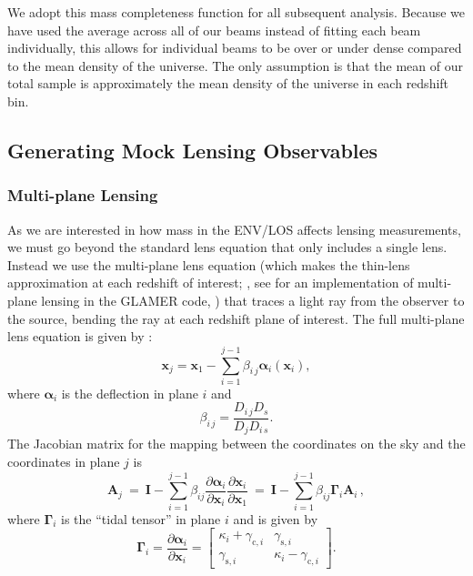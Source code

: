 \documentclass{emulateapj}
\newcommand\A[0]{\mathbf{A}}
\newcommand\I[0]{\mathbf{I}}
\newcommand\GammaMat[0]{\boldsymbol{\Gamma}}
\newcommand\x[0]{\mathbf{x}}
\newcommand\al[0]{\boldsymbol{\alpha}}
\begin{document}
We adopt this mass completeness function for all subsequent analysis. Because we have used the average across all of our beams instead of fitting each beam individually, this allows for individual beams to be over or under dense compared to the mean density of the universe. The only assumption is that the mean of our total sample is approximately the mean density of the universe in each redshift bin. 


\subsection{Generating Mock Lensing Observables} \label{sec:observables}

\subsubsection{Multi-plane Lensing}
As we are interested in how mass in the ENV/LOS affects lensing measurements, we must go beyond the standard lens equation that only includes a single lens. Instead we use the multi-plane lens equation (which makes the thin-lens approximation at each redshift of interest; \citealt{PLW}, see \citealt{Petkova14} for an implementation of multi-plane lensing in the GLAMER code, \citealt{Metcalf14}) that traces a light ray from the observer to the source, bending the ray at each redshift plane of interest. The full multi-plane lens equation is given by \citet{PLW}:
\begin{equation}
\x_{j} = \x_1 - \sum_{i=1}^{j - 1} \beta_{i\,j} \al_i(\x_i),
\label{eqn:full_mp}
\end{equation}
where $\al_i$ is the deflection in plane $i$ and
\begin{equation}
\beta_{i\,j} = \frac{D_{i\,j} D_s}{D_{j}D_{i\,s}}.
\end{equation}
The Jacobian matrix for the mapping between the coordinates on the sky and the coordinates in plane $j$ is
\begin{equation} \label{eq:multi-A}
  \A_{j} \ = \ \I - \sum_{i=1}^{j-1} \beta_{ij} \frac{\partial\al_i}{\partial\x_i}
       \frac{\partial\x_i}{\partial\x_1}
  \ =\ \I - \sum\limits_{i=1}^{j-1} \beta_{ij} \GammaMat_i \A_i\,,
\end{equation}
where $\GammaMat_i$ is the ``tidal tensor'' in plane $i$ and is given by
\begin{equation}
  \GammaMat_i = \frac{\partial\al_i}{\partial\x_i}
  = \left[\begin{array}{cc}
    \kappa_i + \gamma_{\mathrm{c},i} & \gamma_{\mathrm{s},i} \\
    \gamma_{\mathrm{s},i} & \kappa_i - \gamma_{\mathrm{c},i}
  \end{array}\right].
\end{equation}
\end{document}
